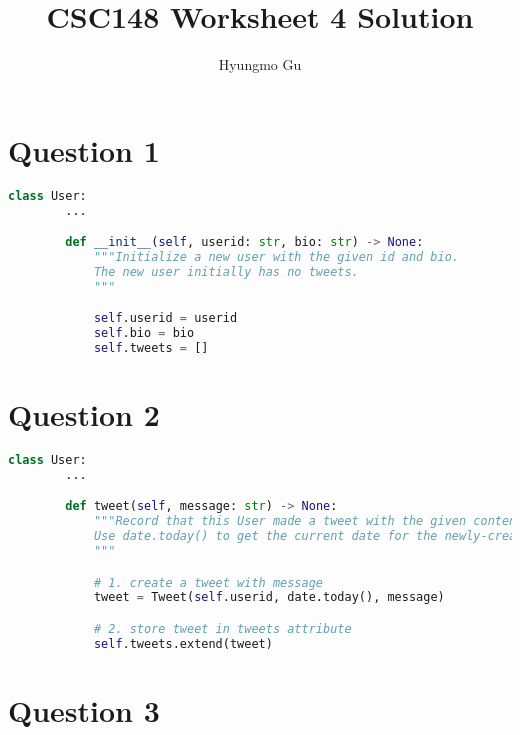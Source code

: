 \documentclass[12pt]{article}
\begin{document}
\title{CSC148 Worksheet 4 Solution}
\author{Hyungmo Gu}
\maketitle

\section*{Question 1}
\begin{lstlisting}[language=Python]
    class User:
        ...

        def __init__(self, userid: str, bio: str) -> None:
            """Initialize a new user with the given id and bio.
            The new user initially has no tweets.
            """

            self.userid = userid
            self.bio = bio
            self.tweets = []

\end{lstlisting}


\section*{Question 2}

\begin{lstlisting}[language=Python]
    class User:
        ...

        def tweet(self, message: str) -> None:
            """Record that this User made a tweet with the given content.
            Use date.today() to get the current date for the newly-created tweet.
            """

            # 1. create a tweet with message
            tweet = Tweet(self.userid, date.today(), message)

            # 2. store tweet in tweets attribute
            self.tweets.extend(tweet)

\end{lstlisting}


\section*{Question 3}
\
\end{document}
